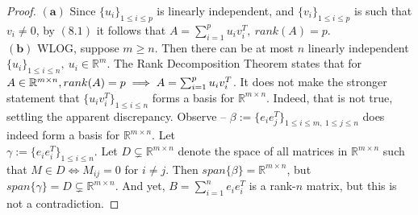 \documentclass[11pt]{article}
\theoremstyle{quest}
\begin{document}
\begin{proof}
$\mathbf{(a)}$ Since $\{u_i\}_{1 \le i \le p}$ is linearly independent, and $\{v_i\}_{1 \le i \le p}$ is such that $v_i \ne 0$, by $(8.1)$ it follows that $A = \sum_{i=1}^p u_iv_i^T,\ rank(A) = p$.
\\$\mathbf{(b)}$ WLOG, suppose $m \ge n$. Then there can be at most $n$ linearly independent $\{u_i\}_{1 \le i \le n},\ u_i \in \mathbb{R}^m$. The Rank Decomposition Theorem states that for $A \in \mathbb{R}^{m \times n},\\ rank(A) = p \implies A = \sum_{i=1}^p u_iv_i^T$. It does not make the stronger statement that $\{u_i v_i^T\}_{1 \le i \le n}$ forms a basis for $\mathbb{R}^{m \times n}$. Indeed, that is not true, settling the apparent discrepancy. Observe -- $\beta := \{e_i e_j^T\}_{1 \le i \le m,\ 1 \le j \le n}$ does indeed form a basis for $\mathbb{R}^{m \times n}$. Let
\\$\gamma := \{e_i e_i^T\}_{1 \le i \le n}$. Let $D \subsetneq \mathbb{R}^{m \times n}$ denote the space of all  matrices in $\mathbb{R}^{m \times n}$ such that $M \in D \iff M_{ij} = 0$ for $i \ne j$. Then $span\{\beta\} = \mathbb{R}^{m \times n}$, but $span\{\gamma\} = D \subsetneq \mathbb{R}^{m \times n}$. And yet, $B = \sum_{i=1}^n e_i e_i^T$ is a rank-$n$ matrix, but this is not a contradiction.
\end{proof}
\end{document}
